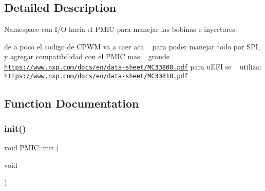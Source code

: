 \subsection{Detailed Description}
Namespace con I/O hacia el P\+M\+IC para manejar las bobinas e inyectores. 

de a poco el codigo de C\+P\+WM va a caer aca ~\newline
para poder manejar todo por S\+PI, y agregar compatibilidad con el P\+M\+IC mas ~\newline
grande \href{https://www.nxp.com/docs/en/data-sheet/MC33800.pdf}{\tt https\+://www.\+nxp.\+com/docs/en/data-\/sheet/\+M\+C33800.\+pdf} para u\+E\+FI se ~\newline
utiliza\+: \href{https://www.nxp.com/docs/en/data-sheet/MC33810.pdf}{\tt https\+://www.\+nxp.\+com/docs/en/data-\/sheet/\+M\+C33810.\+pdf} 

\subsection{Function Documentation}
\mbox{\label{group__PMIC_gaf878c10ae8fe4de3f17a586947e72f58}} 
\subsubsection{\texorpdfstring{init()}{init()}}
{\footnotesize\ttfamily void P\+M\+I\+C\+::init (\begin{DoxyParamCaption}\item[{void}]{ }\end{DoxyParamCaption})}

